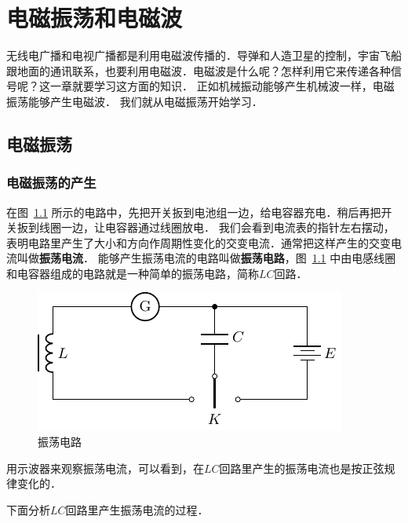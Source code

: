 \chapter{电磁振荡和电磁波}\label{chapter-electromagnetic-oscillations-and-waves}

无线电广播和电视广播都是利用电磁波传播的．导弹和人造卫星的控制，宇宙飞船跟地面的通讯联系，也要利用电磁波．电磁波是什么呢？怎样利用它来传递各种信号呢？这一章就要学习这方面的知识．
正如机械振动能够产生机械波一样，电磁振荡能够产生电磁波．
我们就从电磁振荡开始学习．

\section{电磁振荡}
\subsection{电磁振荡的产生}


在图~\ref{fig_C_4-1} 所示的电路中，先把开关扳到电池组一边，给电容器充电．稍后再把开关扳到线圈一边，让电容器通过线圈放电．
我们会看到电流表的指针左右摆动，表明电路里产生了大小和方向作周期性变化的交变电流．通常把这样产生的交变电流叫做\textbf{振荡电流}．
能够产生振荡电流的电路叫做\textbf{振荡电路}，图~\ref{fig_C_4-1} 中由电感线圈和电容器组成的电路就是一种简单的振荡电路，简称$LC$回路．

\begin{figure}[htbp]
	\centering
	\includegraphics{fig/C/4-1.pdf}
	\caption{振荡电路}\label{fig_C_4-1}
\end{figure}


用示波器来观察振荡电流，可以看到，在$LC$回路里产生的振荡电流也是按正弦规律变化的．

下面分析$LC$回路里产生振荡电流的过程．

